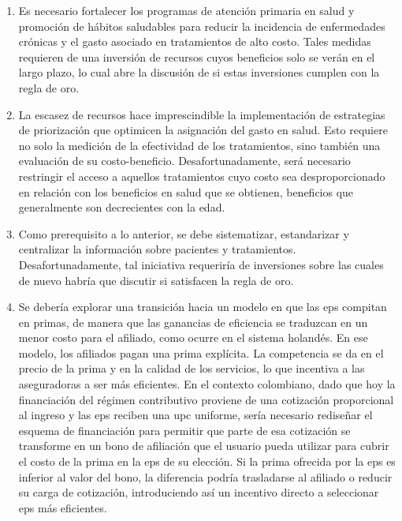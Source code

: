 \begin{enumerate}
    \item Es necesario fortalecer los programas de atención primaria en salud y promoción de hábitos saludables para reducir la incidencia de enfermedades crónicas y el gasto asociado en tratamientos de alto costo. Tales medidas requieren de una inversión de recursos cuyos beneficios solo se verán en el largo plazo, lo cual abre la discusión de si estas inversiones cumplen con la regla de oro. 
    \item La escasez de recursos hace imprescindible la implementación de estrategias de priorización que optimicen la asignación del gasto en salud. Esto requiere no solo la medición de la efectividad de los tratamientos, sino también una evaluación de su costo-beneficio. Desafortunadamente, será necesario restringir el acceso a aquellos tratamientos cuyo costo sea desproporcionado en relación con los beneficios en salud que se obtienen, beneficios que generalmente son decrecientes con la edad. 
    \item Como prerequisito a lo anterior, se debe sistematizar, estandarizar y centralizar la información sobre pacientes y tratamientos. Desafortunadamente, tal iniciativa requeriría de inversiones sobre las cuales de nuevo habría que discutir si satisfacen la regla de oro.
    
    \item Se debería explorar una transición hacia un modelo en que las \gls{eps} compitan en primas, de manera que las ganancias de eficiencia se traduzcan en un menor costo para el afiliado, como ocurre en el sistema holandés. En ese modelo, los afiliados pagan una prima explícita. La competencia se da en el precio de la prima y en la calidad de los servicios, lo que incentiva a las aseguradoras a ser más eficientes. En el contexto colombiano, dado que hoy la financiación del régimen contributivo proviene de una cotización proporcional al ingreso y las \gls{eps} reciben una \gls{upc} uniforme, sería necesario rediseñar el esquema de financiación para permitir que parte de esa cotización se transforme en un bono de afiliación que el usuario pueda utilizar para cubrir el costo de la prima en la \gls{eps} de su elección. Si la prima ofrecida por la \gls{eps} es inferior al valor del bono, la diferencia podría trasladarse al afiliado o reducir su carga de cotización, introduciendo así un incentivo directo a seleccionar \gls{eps} más eficientes. 


\end{enumerate}
